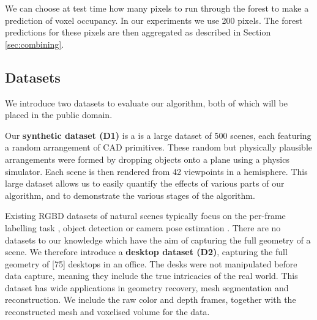 \documentclass[10pt,twocolumn,letterpaper]{article}
\renewcommand{\paragraph}{\vspace{2pt}\noindent\textbf}
\begin{document}
We can choose at test time how many pixels to run through the forest to make a prediction of voxel occupancy.
In our experiments we use 200 pixels.
The forest predictions for these pixels are then aggregated as described in Section \ref{sec:combining}.




\subsection{Datasets}
We introduce two datasets to evaluate our algorithm, both of which will be placed in the public domain.

Our \textbf{synthetic dataset (D1)} is a is a large dataset of 500 scenes, each featuring a random arrangement of CAD primitives.
These random but physically plausible arrangements were formed by dropping objects onto a plane using a physics simulator. Each scene is then rendered from 42 viewpoints in a hemisphere.
This large dataset allows us to easily quantify the effects of various parts of our algorithm, and to demonstrate the various stages of the algorithm.

Existing RGBD datasets of natural scenes typically focus on the per-frame labelling task \cite{nyu, sun3d}, object detection \cite{rgbd scenes dataset} or camera pose estimation \cite{stanford?}.
There are no datasets to our knowledge which have the aim of capturing the full geometry of a scene.
We therefore introduce a \textbf{desktop dataset (D2)}, capturing the full geometry of [75] desktops in an office.
The desks were not manipulated before data capture, meaning they include the true intricacies of the real world.
This dataset has wide applications in geometry recovery, mesh segmentation and reconstruction.
We include the raw color and depth frames, together with the reconstructed mesh and voxelised volume for the data.
\end{document}
